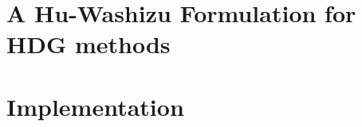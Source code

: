 \documentclass[anti,rapport,anglais]{note_technique_2018}
\begin{document}
\chapter{A Hu-Washizu Formulation for HDG methods}


\chapter{Implementation}





\end{document}

